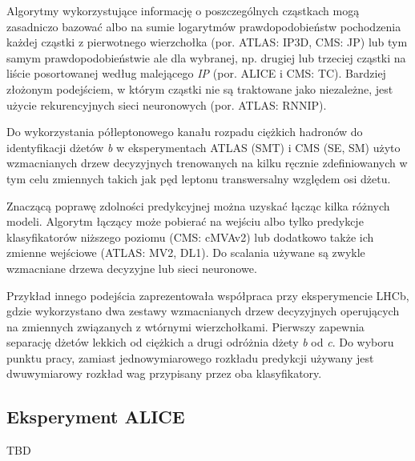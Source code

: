 Algorytmy wykorzystujące informację o poszczególnych cząstkach mogą zasadniczo bazować albo na sumie logarytmów prawdopodobieństw pochodzenia każdej cząstki z pierwotnego wierzchołka (por. ATLAS: IP3D, CMS: JP) lub tym samym prawdopodobieństwie ale dla wybranej, np. drugiej lub trzeciej cząstki na liście posortowanej według malejącego \textit{IP} (por. ALICE i CMS: TC). Bardziej złożonym podejściem, w którym cząstki nie są traktowane jako niezależne, jest użycie rekurencyjnych sieci neuronowych (por. ATLAS: RNNIP).

Do wykorzystania półleptonowego kanału rozpadu ciężkich hadronów do identyfikacji dżetów \textit{b} w eksperymentach ATLAS (SMT) i CMS (SE, SM) użyto wzmacnianych drzew decyzyjnych trenowanych na kilku ręcznie zdefiniowanych w tym celu zmiennych takich jak pęd leptonu transwersalny względem osi dżetu.

Znaczącą poprawę zdolności predykcyjnej można uzyskać łącząc kilka różnych modeli. 
Algorytm łączący może pobierać na wejściu albo tylko predykcje klasyfikatorów niższego poziomu (CMS: cMVAv2) lub dodatkowo także ich zmienne wejściowe (ATLAS: MV2, DL1). Do scalania używane są zwykle wzmacniane drzewa decyzyjne lub sieci neuronowe.

Przykład innego podejścia zaprezentowała współpraca przy eksperymencie LHCb, gdzie wykorzystano dwa zestawy wzmacnianych drzew decyzyjnych operujących na zmiennych związanych z wtórnymi wierzchołkami. Pierwszy zapewnia separację dżetów lekkich od ciężkich a drugi odróżnia dżety \textit{b} od \textit{c}. 
Do wyboru punktu pracy, zamiast jednowymiarowego rozkładu predykcji używany jest dwuwymiarowy rozkład wag przypisany przez oba klasyfikatory.


\subsection{Eksperyment ALICE}

TBD


